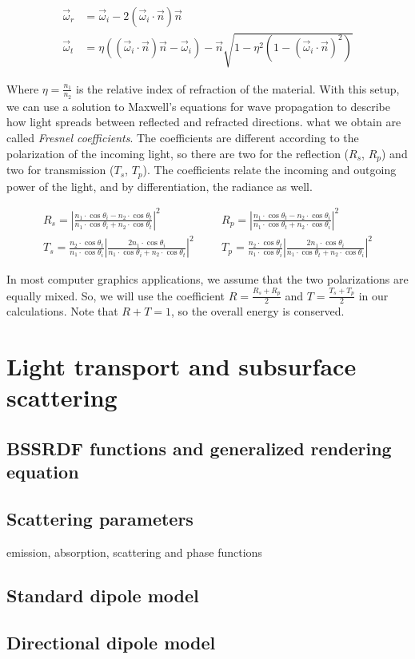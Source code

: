 \begin{equation*}
\begin{split}
\vec{\omega}_r &= \vec{\omega}_i - 2 (\vec{\omega}_i \cdot \vec{n}) \vec{n} \\
\vec{\omega}_t &= \eta ((\vec{\omega}_i \cdot \vec{n}) \vec{n} - \vec{\omega}_i) - \vec{n} \sqrt{1 - \eta^2 (1 - (\vec{\omega}_i \cdot \vec{n}) ^ 2)}
\end{split}
\end{equation*}

Where $\eta = \frac{n_1}{n_2}$ is the relative index of refraction of the material. With this setup, we can use a solution to Maxwell's equations for wave propagation to describe how light spreads between reflected and refracted directions. what we obtain are called \emph{Fresnel coefficients}. The coefficients are different according to the polarization of the incoming light, so there are two for the reflection ($R_s$, $R_p$) and two for transmission ($T_s$, $T_p$). The coefficients relate the incoming and outgoing power of the light, and by differentiation, the radiance as well.

\begin{equation*}
\begin{split}
R_s = \left|\frac{n_1 \cdot \cos\theta_i - n_2 \cdot \cos\theta_t} {n_1 \cdot \cos\theta_i + n_2 \cdot \cos\theta_t}\right|^2 \;\;\;&\;\;\; R_p = \left|\frac{n_1 \cdot \cos\theta_t - n_2 \cdot \cos\theta_i} {n_1 \cdot \cos\theta_t + n_2 \cdot \cos\theta_i}\right|^2\\
T_s = \frac{n_2 \cdot \cos\theta_t}{n_1 \cdot \cos\theta_i} \left|\frac{2 n_1 \cdot \cos\theta_i}{n_1 \cdot \cos\theta_i + n_2 \cdot \cos\theta_t}\right|^2 \;\;\;&\;\;\; T_p = \frac{n_2 \cdot \cos\theta_t}{n_1 \cdot \cos\theta_i}  \left|\frac{2 n_1 \cdot \cos\theta_i}{n_1 \cdot \cos\theta_t + n_2 \cdot \cos\theta_i}\right|^2
\end{split}
\end{equation*}

In most computer graphics applications, we assume that the two polarizations are equally mixed. So, we will use the coefficient $R = \frac{R_s + R_p}{2}$ and $T = \frac{T_s + T_p}{2}$ in our calculations. Note that $R + T = 1$, so the overall energy is conserved.



\section{Light transport and subsurface scattering}
\subsection{BSSRDF functions and generalized rendering equation}
\subsection{Scattering parameters}
 emission, absorption, scattering and phase functions
\subsection{Standard dipole model}
\subsection{Directional dipole model}
